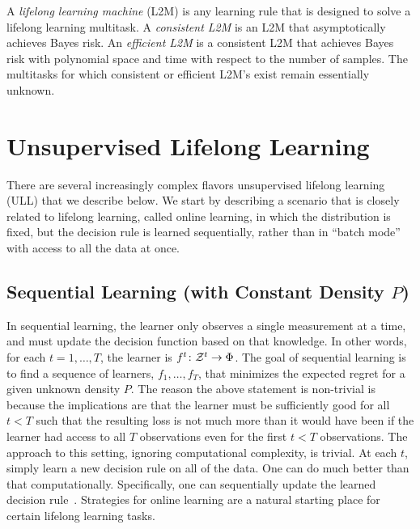 \documentclass{article}
\begin{document}
A \emph{lifelong learning machine} (L2M) is any learning rule that is designed to solve a lifelong learning multitask. A \emph{consistent L2M} is an L2M that asymptotically achieves Bayes risk.  An \emph{efficient L2M}  is a consistent L2M that achieves Bayes risk with polynomial space and time with respect to the number of samples. The multitasks for which consistent or efficient L2M's exist remain essentially unknown.


\section{Unsupervised Lifelong Learning}
\label{sec:continual}

There are several increasingly complex flavors unsupervised lifelong learning (ULL) that we describe below.  We start by describing a scenario that is closely related to lifelong learning, called online learning, in which the distribution is fixed, but the decision rule is learned sequentially, rather than in ``batch mode'' with access to all the data at once. 



\subsection{Sequential Learning (with Constant Density $P$)}
\label{sec:constant}


In sequential learning, the learner only observes a single measurement at a time, and must update the decision function based on that knowledge.  In other words, for each $t = 1,\ldots, T$, the learner is $f^t {\colon} \mathcal{Z}^t \to \Phi$.  
%  
The goal of sequential learning is to find a sequence of learners, $f_1, \ldots, f_T$, that minimizes the expected regret for a given unknown density $P$.  The reason the above statement is non-trivial is because the implications are that the learner must be sufficiently good for all $t<T$ such that the resulting loss is not much more than it would have been if the learner had access to all $T$ observations even for the first $t<T$ observations.
% 
The approach to this setting, ignoring computational complexity, is trivial.  At each $t$, simply learn a new decision rule on all of the data. One can do much better than that computationally.  Specifically, one can sequentially update the learned decision rule~\cite{Xiao2010}. Strategies for online learning are a natural starting place for certain lifelong learning tasks.
\end{document}
